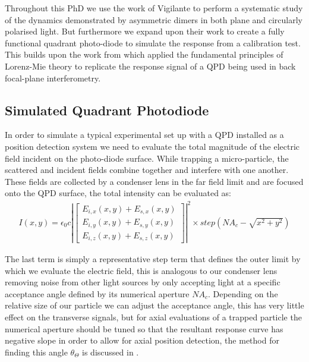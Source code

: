Throughout this PhD we use the work of Vigilante to perform a systematic 
study of the dynamics demonstrated by asymmetric dimers in both plane and 
circularly polarised light. But furthermore we expand upon their work to 
create a fully functional quadrant photo-diode to simulate the response 
from a calibration test. This builds upon the work from \cite{Rohrbach2002} 
which applied the fundamental principles of Lorenz-Mie theory to replicate 
the response signal of a QPD being used in back focal-plane interferometry.

\subsection{Simulated Quadrant Photodiode}
\label{sec:simulated_QPD}
In order to simulate a typical experimental set up with a QPD installed 
as a position detection system we need to evaluate the total magnitude of 
the electric field incident on the photo-diode surface. While trapping a 
micro-particle, the scattered and incident fields combine together and 
interfere with one another. These fields are collected by a condenser 
lens in the far field limit and are focused onto the QPD surface, the 
total intensity can be evaluated as:
\begin{align}
I(x,y) = \epsilon_0c\left|
\begin{bmatrix} 
	E_{i,x}(x,y)+E_{s,x}(x,y) \\ 
	E_{i,y}(x,y)+E_{s,y}(x,y) \\ 
	E_{i,z}(x,y)+E_{s,z}(x,y)
\end{bmatrix} \right|^2 \times step(NA_c-\sqrt{x^2+y^2})
\end{align}

The last term is simply a representative step term that defines the outer 
limit by which we evaluate the electric field, this is analogous to our 
condenser lens removing noise from other light sources by only accepting 
light at a specific acceptance angle defined by its numerical aperture 
$NA_c$. Depending on the relative size of our particle we can adjust 
the acceptance angle, this has very little effect on the transverse 
signals, but for axial evaluations of a trapped particle the numerical 
aperture should be tuned so that the resultant response curve has negative 
slope in order to allow for axial position detection, the method for 
finding this angle $\theta_\Theta$ is discussed in \cite{Friedrich2012}.

